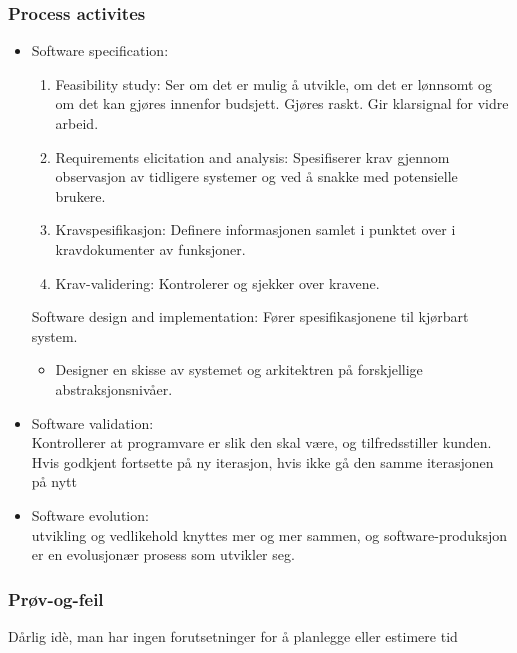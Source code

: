 \documentclass[11pt]{article}
\begin{document}
\subsubsection{Process activites}
\label{sec-4.1.6}
\begin{itemize}

\item Software specification:\\
\label{sec-4.1.6.1}%
\begin{enumerate}
\item Feasibility study: 
       Ser om det er mulig å utvikle, om det er lønnsomt og om det kan gjøres innenfor budsjett. 
       Gjøres raskt. Gir klarsignal for vidre arbeid.
\item Requirements elicitation and analysis: 
       Spesifiserer krav gjennom observasjon av tidligere systemer og ved å snakke med potensielle brukere.
\item Kravspesifikasjon: 
       Definere informasjonen samlet i punktet over i kravdokumenter av funksjoner.
\item Krav-validering: 
       Kontrolerer og sjekker over kravene.
\end{enumerate}

    Software design and implementation: 
    Fører spesifikasjonene til kjørbart system.
\begin{itemize}
\item Designer en skisse av systemet og arkitektren på forskjellige abstraksjonsnivåer.
\end{itemize}


\item Software validation:\\
\label{sec-4.1.6.2}%
Kontrollerer at programvare er slik den skal være, og tilfredsstiller kunden.
     Hvis godkjent fortsette på ny iterasjon, hvis ikke gå den samme iterasjonen på nytt


\item Software evolution:\\
\label{sec-4.1.6.3}%
utvikling og vedlikehold knyttes mer og mer sammen, og software-produksjon er en evolusjonær prosess som utvikler seg.

\end{itemize} %
\subsubsection{Prøv-og-feil}
\label{sec-4.1.7}

    Dårlig idè, man har ingen forutsetninger for å planlegge eller estimere tid
\end{document}
